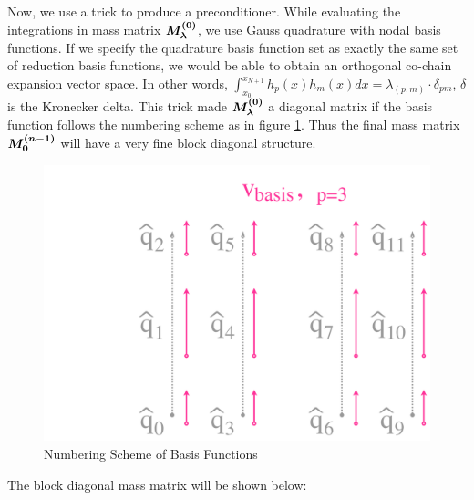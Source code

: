 Now, we use a trick to produce a preconditioner. While evaluating the integrations in mass matrix $\boldsymbol{M_{\lambda}^{(0)}}$, we use Gauss quadrature with nodal basis functions. If we specify the quadrature basis function set as exactly the same set of reduction basis functions, we would be able to obtain an orthogonal co-chain expansion vector space. In other words, $\int_{x_0}^{x_{N+1}} h_p(x)h_m(x) dx = \lambda _{(p,m)}\cdot \delta_{pm}$, $\delta$ is the Kronecker delta. This trick made $\boldsymbol{M_{\lambda}^{(0)}}$ a diagonal matrix if the basis function follows the numbering scheme as in figure \ref{num_scheme}. Thus the final mass matrix $\boldsymbol{M_0^{(n-1)}}$ will have a very fine block diagonal structure. 
\begin{figure}[H]
	\centering
	\includegraphics[width=.4\textwidth]{num_scheme}
	\caption{Numbering Scheme of Basis Functions}
	\label{num_scheme}
\end{figure} 
The block diagonal mass matrix will be shown below:

